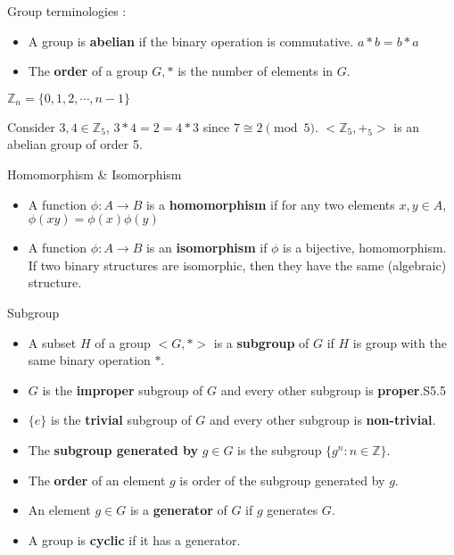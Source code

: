 \begin{definition}Group terminologies :
	\begin{itemize}
		\item A group is \textbf{abelian} if the binary operation is commutative. $a \ast b = b \ast a$%
		\item The \textbf{order} of a group $G,\ast$ is the number of elements in $G$.%
	\end{itemize}
\end{definition}

\begin{definition}
	$\mathbb{Z}_n = \{ 0, 1, 2, \cdots, n-1 \}$
\end{definition}

\begin{remark}
	Consider $3,4 \in \mathbb{Z}_5$,
	$3 \ast 4 = 2 = 4 \ast 3$ since $7 \cong 2 \pmod 5$.
	$<\!\mathbb{Z}_5,+_5\!>$ is an abelian group of order 5.
\end{remark}

\begin{definition} Homomorphism \& Isomorphism
	\begin{itemize}
		\item A function $\phi : A \to B$ is a \textbf{homomorphism} if for any two elements $x,y \in A$, $\phi (xy) = \phi(x)\phi(y)$%
		\item A function $\phi : A \to B$ is an \textbf{isomorphism} if $\phi$ is a bijective, homomorphism.
			If two binary structures  are isomorphic, then they have the same (algebraic) structure.%
	\end{itemize}
\end{definition}

\begin{definition} Subgroup
	\begin{itemize}
		\item A subset $H$ of a group $<\! G,\ast\! >$ is a \textbf{subgroup} of $G$ if $H$ is group with the same binary operation $\ast$.%
		\item $G$ is the \textbf{improper} subgroup of $G$ and every other subgroup is \textbf{proper}.S5.5
		\item $\{e\}$ is the \textbf{trivial} subgroup of $G$ and every other subgroup is \textbf{non-trivial}.%
		\item The \textbf{subgroup generated by} $g \in G$ is the subgroup $\{ g^n : n \in \mathbb{Z} \}$.%
		\item The \textbf{order} of an element $g$ is order of the subgroup generated by $g$.%
		\item An element $g \in G$ is a \textbf{generator} of $G$ if $g$ generates $G$.%
		\item A group is \textbf{cyclic} if it has a generator.%
	\end{itemize}
\end{definition}

